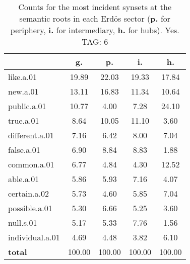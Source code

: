 \begin{table}[h!]
\begin{center}
\begin{tabular}{| l | c | c | c | c |}\hline
 & g. & p. & i. & h. \\\hline
like.a.01 & 19.89  & 22.03  & 19.33  & 17.84 \\\hline
new.a.01 & 13.11  & 16.83  & 11.34  & 10.64 \\\hline
public.a.01 & 10.77  & 4.00  & 7.28  & 24.10 \\\hline
true.a.01 & 8.64  & 10.05  & 11.10  & 3.60 \\\hline
different.a.01 & 7.16  & 6.42  & 8.00  & 7.04 \\\hline
false.a.01 & 6.90  & 8.84  & 8.83  & 1.88 \\\hline
common.a.01 & 6.77  & 4.84  & 4.30  & 12.52 \\\hline
able.a.01 & 5.86  & 5.93  & 7.16  & 4.07 \\\hline
certain.a.02 & 5.73  & 4.60  & 5.85  & 7.04 \\\hline
possible.a.01 & 5.30  & 6.66  & 5.25  & 3.60 \\\hline
null.s.01 & 5.17  & 5.33  & 7.76  & 1.56 \\\hline
individual.a.01 & 4.69  & 4.48  & 3.82  & 6.10 \\\hline
{{\bf total}} & 100.00  & 100.00  & 100.00  & 100.00 \\\hline
\end{tabular}
\caption{Counts for the most incident synsets at the semantic roots in each Erd\"os sector ({\bf p.} for periphery, {\bf i.} for intermediary, {\bf h.} for hubs). Yes. TAG: 6}
\end{center}
\end{table}